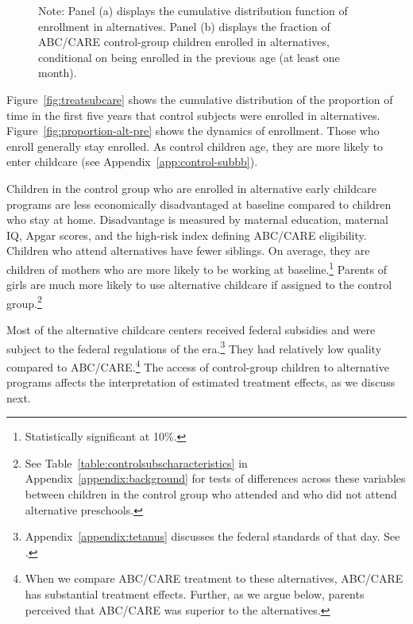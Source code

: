 \begin{figure}
\begin{subfigure}[h]{0.49\textwidth}
\end{subfigure}%
\footnotesize \justify
Note: Panel (a) displays the cumulative distribution function of enrollment in alternatives. Panel (b) displays the fraction of ABC/CARE control-group children enrolled in alternatives, conditional on being enrolled in the previous age (at least one month).\\
\end{figure}

Figure~\ref{fig:treatsubcare} shows the cumulative distribution of the proportion of time in the first five years that control subjects were enrolled in alternatives. Figure~\ref{fig:proportion-alt-pre} shows the dynamics of enrollment. Those who enroll generally stay enrolled. As control children age, they are more likely to enter childcare (see Appendix~\ref{app:control-subbb}).

Children in the control group who are enrolled in alternative early childcare programs are less economically disadvantaged at baseline compared to children who stay at home. Disadvantage is measured by maternal education, maternal IQ, Apgar scores, and the high-risk index defining ABC/CARE eligibility. Children who attend alternatives have fewer siblings. On average, they are children of mothers who are more likely to be working at baseline.\footnote{Statistically significant at 10\%.} Parents of girls are much more likely to use alternative childcare if assigned to the control group.\footnote{See Table~\ref{table:controlsubscharacteristics} in Appendix~\ref{appendix:background} for tests of differences across these variables between children in the control group who attended and who did not attend alternative preschools.}

Most of the alternative childcare centers received federal subsidies and were subject to the federal regulations of the era.\footnote{Appendix~\ref{appendix:tetanus} discusses the federal standards of that day. See \citet{Department-of-Health_1968_DayCareRequirements,NCGA_1971_House-Bill-100,Ramey-et-al_1977_Intro-to-ABC,Ramey_Campbell_1979_SR,Ramey_McGinness_etal_1982_Abecedarianapproach, Burchinal_Campbell_etal_1997_CD}.} They had relatively low quality compared to ABC/CARE.\footnote{When we compare ABC/CARE treatment to these alternatives, ABC/CARE has substantial treatment effects. Further, as we argue below, parents perceived that ABC/CARE was superior to the alternatives.} The access of control-group children to alternative programs affects the interpretation of estimated treatment effects, as we discuss next.

